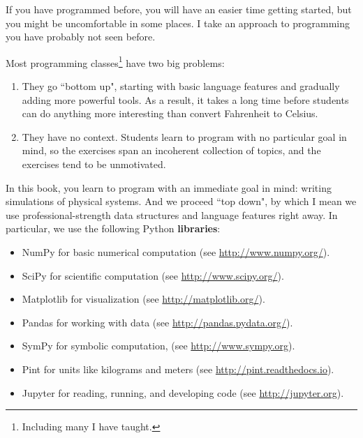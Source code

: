 \documentclass[12pt]{book}
\theoremstyle{exercise}
\begin{document}
If you have programmed before, you will have an easier time getting started, but you might be uncomfortable in some places.  I take an approach to programming you have probably not seen before.

Most programming classes\footnote{Including many I have taught.} have two big problems:

\begin{enumerate}

\item They go ``bottom up", starting with basic language features and gradually adding more powerful tools.  As a result, it takes a long time before students can do anything more interesting than convert Fahrenheit to Celsius.


\item They have no context.  Students learn to program with no particular goal in mind, so the exercises span an incoherent collection of topics, and the exercises tend to be unmotivated.

\end{enumerate}

In this book, you learn to program with an immediate goal in mind: writing simulations of physical systems.  And we proceed ``top down", by which I mean we use professional-strength data structures and language features right away.  In particular, we use the following Python {\bf libraries}:


\begin{itemize}

\item NumPy for basic numerical computation (see \url{http://www.numpy.org/}).


\item SciPy for scientific computation (see \url{http://www.scipy.org/}).


\item Matplotlib for visualization (see \url{http://matplotlib.org/}).


\item Pandas for working with data (see \url{http://pandas.pydata.org/}).


\item SymPy for symbolic computation, (see \url{http://www.sympy.org}).


\item Pint for units like kilograms and meters (see \url{http://pint.readthedocs.io}).


\item Jupyter for reading, running, and developing code (see \url{http://jupyter.org}).


\end{itemize}
\end{document}
